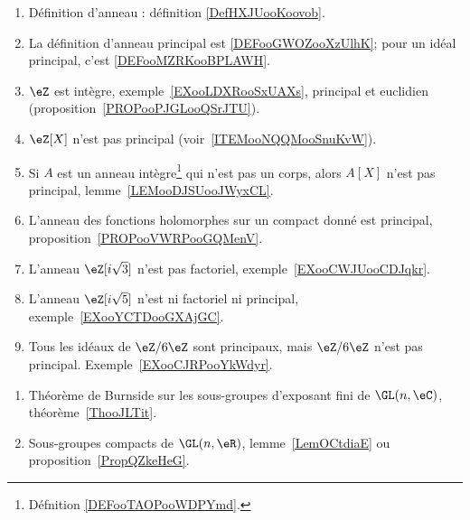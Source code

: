 
\begin{enumerate}
    \item
        Définition d'anneau : définition \ref{DefHXJUooKoovob}.
    \item
        La définition d'anneau principal est \ref{DEFooGWOZooXzUlhK}; pour un idéal principal, c'est \ref{DEFooMZRKooBPLAWH}.
    \item
        \( \eZ\) est intègre, exemple~\ref{EXooLDXRooSxUAXs}, principal et euclidien (proposition~\ref{PROPooPJGLooQSrJTU}).
    \item
        \( \eZ[X]\) n'est pas principal (voir~\ref{ITEMooNQQMooSnuKvW}).
    \item   \label{ITEMooNQQMooSnuKvW}
        Si \( A\) est un anneau intègre\footnote{Défnition \ref{DEFooTAOPooWDPYmd}.} qui n'est pas un corps, alors \( A[X]\) n'est pas principal, lemme~\ref{LEMooDJSUooJWyxCL}.
    \item
        L'anneau des fonctions holomorphes sur un compact donné est principal, proposition~\ref{PROPooVWRPooGQMenV}.
    \item
        L'anneau \( \eZ[i\sqrt{ 3 }]\) n'est pas factoriel, exemple~\ref{EXooCWJUooCDJqkr}.
    \item
        L'anneau \( \eZ[i\sqrt{ 5 }]\) n'est ni factoriel ni principal, exemple~\ref{EXooYCTDooGXAjGC}.
    \item
        Tous les idéaux de \( \eZ/6\eZ\) sont principaux, mais \( \eZ/6\eZ\) n'est pas principal. Exemple~\ref{EXooCJRPooYkWdyr}.
\end{enumerate}


\begin{enumerate}
    \item
        Théorème de Burnside sur les sous-groupes d'exposant fini de \( \GL(n,\eC)\), théorème~\ref{ThooJLTit}.
    \item
        Sous-groupes compacts de \( \GL(n,\eR)\), lemme~\ref{LemOCtdiaE} ou proposition~\ref{PropQZkeHeG}.
\end{enumerate}

       \label{THEMEooQEEWooXDhvhv}

